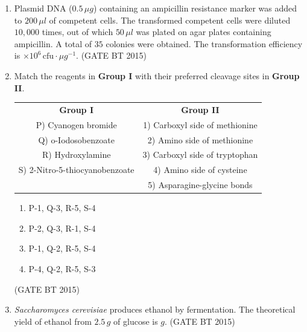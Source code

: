 \documentclass[journal,12pt,onecolumn]{IEEEtran}
\begin{document}
\begin{enumerate}[label=\textbf{Q.\arabic*}]
\item Plasmid DNA ($0.5 \, \mu g$) containing an ampicillin resistance marker was added to $200 \, \mu l$ of competent cells. The transformed competent cells were diluted $10{,}000$ times, out of which $50 \, \mu l$ was plated on agar plates containing ampicillin. A total of $35$ colonies were obtained. The transformation efficiency is \underline{\hspace{2cm}} $\times 10^{6} \, \text{cfu} \cdot \mu g^{-1}$.
\hfill (GATE BT 2015)


\item Match the reagents in \textbf{Group I} with their preferred cleavage sites in \textbf{Group II}.  

\begin{table}[H]
\begin{tabular}{cc}
\textbf{Group I} & \textbf{Group II} \\
P) Cyanogen bromide                & 1) Carboxyl side of methionine \\
Q) o-Iodosobenzoate                & 2) Amino side of methionine \\
R) Hydroxylamine                   & 3) Carboxyl side of tryptophan \\
S) 2-Nitro-5-thiocyanobenzoate     & 4) Amino side of cysteine \\
                                   & 5) Asparagine-glycine bonds \\
\end{tabular}
\end{table}
\begin{multicols}{2}
\begin{enumerate}
    \item P-1, Q-3, R-5, S-4
    \item P-2, Q-3, R-1, S-4
    \item P-1, Q-2, R-5, S-4
    \item P-4, Q-2, R-5, S-3
\end{enumerate}
\end{multicols}\hfill (GATE BT 2015)




\item\textit{Saccharomyces cerevisiae} produces ethanol by fermentation. The theoretical yield of ethanol from $2.5 \, g$ of glucose is \underline{\hspace{2cm}} $g$.
\hfill (GATE BT 2015)





\end{enumerate}
\end{document}
